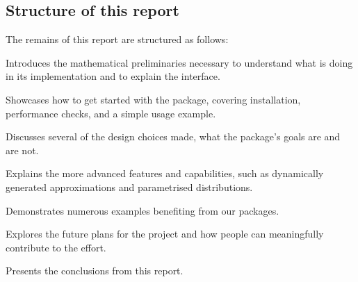 \subsection{Structure of this report}

The remains of this report are structured as follows:
\begin{longdescription}
\item[\Cref{sec:mathematical_preliminaries}] Introduces the mathematical preliminaries necessary to understand what \arv is doing in its implementation and to explain the \pyarv interface. 
\item[\Cref{sec:getting_started_with_pyarv}] Showcases how to get started with the \pyarv package, covering installation, performance checks, and a simple usage example.
\item[\Cref{sec:design_choices}] Discusses several of the design choices made, what the package's goals are and are not. 
\item[\Cref{sec:advanced_usage}] Explains the more advanced features and capabilities, such as dynamically generated approximations and parametrised distributions.
\item[\Cref{sec:examples}] Demonstrates numerous examples benefiting from our packages.
\item[\Cref{sec:future_plans}] Explores the future plans for the project and how people can meaningfully contribute to the effort.
\item[\Cref{sec:conclusions}] Presents the conclusions from this report.
\end{longdescription}
 